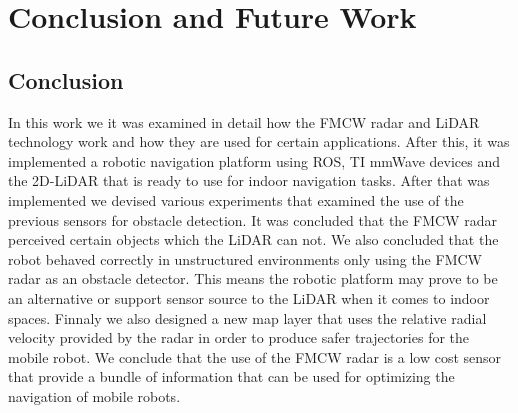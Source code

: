 \chapter{Conclusion and Future Work}


\section{Conclusion}
In this work we it was examined in detail how the \ac{FMCW} \ac{radar} and \ac{LiDAR} technology work and how they are used for certain applications. After this, it was implemented a robotic navigation platform using \ac{ROS}, \ac{TI} \ac{mmWave} devices and the 2D-\ac{LiDAR} that is ready to use for indoor navigation tasks. After that was implemented we devised various experiments that examined the use of the previous sensors for obstacle detection. It was concluded that the \ac{FMCW} \ac{radar} perceived certain objects which the \ac{LiDAR} can not. We also concluded that the robot behaved correctly in unstructured environments only using the \ac{FMCW} \ac{radar} as an obstacle detector. This means the robotic platform may prove to be an alternative or support sensor source to the \ac{LiDAR} when it comes to indoor spaces. Finnaly we also designed a new map layer that uses the relative radial velocity provided by the \ac{radar} in order to produce safer trajectories for the mobile robot. We conclude that the use of the \ac{FMCW} \ac{radar} is a low cost sensor that provide a bundle of information that can be used for optimizing the navigation of mobile robots.
